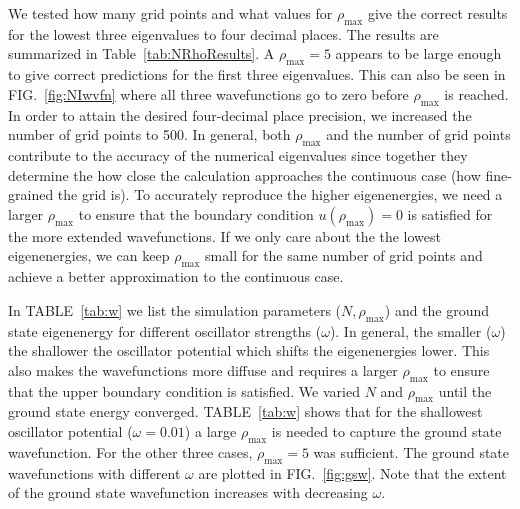 \documentclass[10pt,showpacs,preprintnumbers,footinbib,amsmath,amssymb,aps,prl,twocolumn,groupedaddress,superscriptaddress,showkeys]{revtex4-1}
\newcommand{\rhomax}{
	\ensuremath{ \rho _{\mathrm{max}}} }
\begin{document}
{We tested how many grid points and what values for \rhomax give
the correct results for the lowest three eigenvalues to four decimal places.
The results are summarized in Table~\ref{tab:NRhoResults}. A
$\rhomax = 5$ appears to be large enough to give correct predictions
for the first three eigenvalues. This can also be seen in FIG.~\ref{fig:NIwvfn}
where all three wavefunctions go to zero before \rhomax is reached.
In order to attain the desired four-decimal
place precision, we increased the number of grid points to 500. In general,
both \rhomax and the number of grid points contribute to the accuracy of
the numerical eigenvalues since together they determine the how close
the calculation approaches the continuous case (how fine-grained the grid is).
To accurately reproduce the higher
eigenenergies, we need a larger \rhomax to ensure that the boundary
condition $u(\rhomax)=0$ is satisfied for the more extended
wavefunctions. If we only care about the the
lowest eigenenergies, we can keep \rhomax small for the same number
of grid points and achieve a better approximation to the continuous
case.

In TABLE~\ref{tab:w} we list the simulation parameters ($N,\rhomax$)
and the ground state eigenenergy for different oscillator strengths ($\omega$).
In general, the smaller ($\omega$) the shallower the oscillator potential which
shifts the eigenenergies lower. This also makes the wavefunctions more diffuse
and requires a larger \rhomax to ensure that the upper boundary condition is
satisfied. We varied $N$ and \rhomax until the ground state energy converged.
TABLE~\ref{tab:w} shows that for the shallowest oscillator potential ($\omega = 0.01$)
a large \rhomax is needed to capture the ground state wavefunction. For the
other three cases, $\rhomax=5$ was sufficient. The ground state wavefunctions
with different $\omega$ are plotted in FIG.~\ref{fig:gsw}. Note that the extent of
the ground state wavefunction increases with decreasing $\omega$.


}
\end{document}
